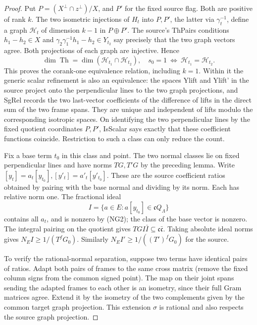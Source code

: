 \begin{proof}
Put \(P=(X^\perp\cap z^\perp)/X\), and \(P'\) for the fixed
source flag. Both are positive of rank \(k\). The two
isometric injections of \(H_t\) into \(P,P'\), the latter
via \(\gamma_t^{-1}\), define a graph \(\mathcal H_t\)
of dimension \(k-1\) in \(P\oplus P'\).
The source's ThPairs conditions
\(h_1-h_2\in X\) and
\(\gamma_2\gamma_1^{-1}h_1-h_2\in Y_{t_2}\) say precisely
that the two graph vectors agree. Both projections of
each graph are injective. Hence
\[
 \dim\operatorname{Th}=\dim(\mathcal H_{t_1}\cap\mathcal H_{t_2}),
 \quad s_0=1\ \Longleftrightarrow\
                  \mathcal H_{t_1}=\mathcal H_{t_2}.
\]
This proves the corank-one equivalence relation, including
\(k=1\). Within it the generic scalar refinement is also
an equivalence: the spaces Ylift and Ylift' in the source
project onto the perpendicular lines to the two graph
projections, and SgRel records the two last-vector
coefficients of the difference of lifts in the direct
sum of the two frame spans. They are unique and independent
of lifts modulo the corresponding isotropic spaces.
On identifying the two perpendicular lines by the fixed
quotient coordinates \(P,P'\), IsScalar says exactly that
these coefficient functions coincide. Restriction to such
a class can only reduce the count.

Fix a base term \(t_0\) in this class and point. The two
normal classes lie on fixed perpendicular lines and have
norms \(TG,T'G\) by the preceding lemma. Write
\([y_t]=a_t[y_{t_0}], [y'_t]=a'_t[y'_{t_0}]\).
These are the source coefficient ratios obtained by
pairing with the base normal and dividing by its norm.
Each has relative norm one. The fractional ideal
\[
 I=\{a\in E:a[y_{t_0}]\in\mathfrak c Q_\Lambda\}
\]
contains all \(a_t\), and is nonzero by (NG2); the class
of the base vector is nonzero. The integral pairing on
the quotient gives \(TG I\bar I\subseteq
\mathfrak c\bar{\mathfrak c}\). Taking absolute ideal
norms gives \(N_E I\ge1/(T^f G_0)\).
Similarly \(N_E I'\ge1/((T')^fG_0)\) for the source.

To verify the rational-normal separation, suppose two
terms have identical pairs of ratios. Adapt both pairs
of frames to the same cross matrix (remove the fixed
column signs from the common signed point).
The map on their joint spans sending the adapted
frames to each other is an isometry, since their full
Gram matrices agree. Extend it by the isometry of
the two complements given by the common target graph
projection. This extension \(\sigma\) is rational and
also respects the source graph projection.


\end{proof}
